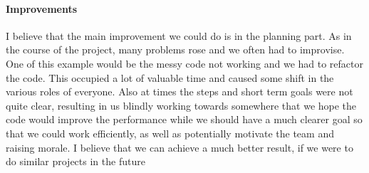 \paragraph{Improvements}
I believe that the main improvement we could do is in the planning part. As in the course of the project, many problems rose and we often had to improvise. One of this example would be the messy code not working and we had to refactor the code. This occupied a lot of valuable time and caused some shift in the various roles of everyone. Also at times the steps and short term goals were not quite clear, resulting in us blindly working towards somewhere that we hope the code would improve the performance while we should have a much clearer goal so that we could work efficiently, as well as potentially motivate the team and raising morale. I believe that we can achieve a much better result, if we were to do similar projects in the future